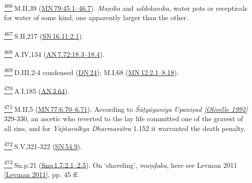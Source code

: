 \label{footprints_split_025.html_fn466}
\hyperref[footprints_split_013.htmlux5cux23fnref466]{\textsuperscript{466}} M.II,39
(\href{https://suttacentral.net/mn79/en/sujato\#45.1}{MN\,79:45.1--46.7}).
\emph{Maṇika} and \emph{uddekanika}, water pots or recepticals for water
of some kind, one apparently larger than the other.

\label{footprints_split_025.html_fn467}
\hyperref[footprints_split_013.htmlux5cux23fnref467]{\textsuperscript{467}} S.II,217
(\href{https://suttacentral.net/sn16.11/en/sujato\#2.1}{SN\,16.11:2.1}).

\label{footprints_split_025.html_fn468}
\hyperref[footprints_split_013.htmlux5cux23fnref468]{\textsuperscript{468}} A.IV,134
(\href{https://suttacentral.net/an7.72/en/sujato\#18.3}{AN\,7.72:18.3--18.4}).

\label{footprints_split_025.html_fn469}
\hyperref[footprints_split_013.htmlux5cux23fnref469]{\textsuperscript{469}} D.III,2-4
condensed (\href{https://suttacentral.net/dn24/en/sujato}{DN\,24});
M.I,68
(\href{https://suttacentral.net/mn12/en/sujato\#2.1}{MN\,12:2.1--8.18}).

\label{footprints_split_025.html_fn470}
\hyperref[footprints_split_013.htmlux5cux23fnref470]{\textsuperscript{470}} A.I,185
(\href{https://suttacentral.net/an3.64/en/sujato}{AN\,3.64}).

\label{footprints_split_025.html_fn471}
\hyperref[footprints_split_013.htmlux5cux23fnref471]{\textsuperscript{471}} M.II,5
(\href{https://suttacentral.net/mn77/en/sujato\#6.70}{MN\,77:6.70--6.71}).
According to \emph{{Śāṭyāyanīya Upaniṣad
{{[}\hyperref[footprints_split_022.htmlux5cux23Olivelleux5cux25201992]{Olivelle
1992}{]}}}} 329-330, an ascetic who reverted to the lay life committed
one of the gravest of all sins, and for \emph{Yājñavalkya Dharmasūtra}
1.152 it warranted the death penalty.

\label{footprints_split_025.html_fn472}
\hyperref[footprints_split_013.htmlux5cux23fnref472]{\textsuperscript{472}} S.V,321-322
(\href{https://suttacentral.net/sn54.9/en/sujato}{SN\,54.9}).

\label{footprints_split_025.html_fn473}
\hyperref[footprints_split_013.htmlux5cux23fnref473]{\textsuperscript{473}} Sn.p.21
(\href{https://suttacentral.net/snp1.7/en/sujato\#2.1}{Snp\,1.7:2.1--2.5}).
On `shaveling', \emph{muṇḍaka}, here see {Levman 2011
{{[}\hyperref[footprints_split_022.htmlux5cux23Levmanux5cux25202011]{Levman
2011}{]}}}, pp. 45 ff.

